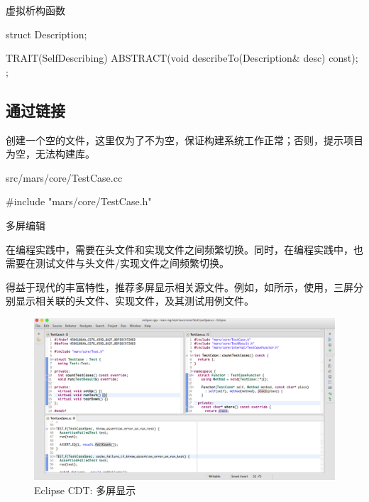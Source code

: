 \begin{content}
\begin{episode}{虚拟析构函数}
\begin{content}
\begin{c++}
struct Description;

TRAIT(SelfDescribing) {
  ABSTRACT(void describeTo(Description& desc) const);
};
\end{c++}

\end{content}
\end{episode}

\subsection{通过链接}

创建一个空的文件，这里仅为了不为空，保证构建系统工作正常；否则，提示项目为空，无法构建库。

\begin{nodiff}{src/mars/core/TestCase.cc}
 \begin{c++}
#include "mars/core/TestCase.h"
 \end{c++}
\end{nodiff}

\begin{episode}{多屏编辑}

\begin{content}

在\cpp{}编程实践中，需要在头文件和实现文件之间频繁切换。同时，在编程实践中，也需要在测试文件与头文件/实现文件之间频繁切换。

得益于现代的丰富特性，推荐多屏显示相关源文件。例如，如所示，使用，三屏分别显示相关联的头文件、实现文件，及其测试用例文件。

\begin{figure}[H]
\centering
\includegraphics[width=1.0\textwidth]{figures/xunit/multi-editor-eclipse.png}
\caption{Eclipse CDT: 多屏显示}
 \label{fig:multi-editor-eclipse}
\end{figure}


\end{content}
\end{episode}
\end{content}
